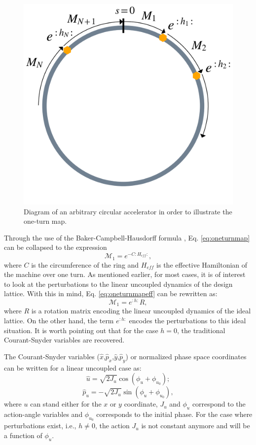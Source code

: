 \begin{figure}[H]
    \centering
    \includegraphics[width=0.7\columnwidth]{chapter2/oneturn.png}
    \caption{Diagram of an arbitrary circular accelerator in order to illustrate the one-turn map.}
    \label{fig:oneturn}
 \end{figure}

Through the use of the Baker-Campbell-Hausdorff formula \cite{bch}, Eq. \ref{eq:oneturnmap} can be collapsed to the expression 
\begin{equation}
    \label{eq:oneturnmapeff}
    \mathcal{M}_1=e^{-C :H_{eff}:},
\end{equation}
where $C$ is the circumference of the ring and $H_{eff}$ is the effective Hamiltonian of the machine over one turn. As mentioned earlier, for most cases, it is of interest to look at the perturbations to the linear uncoupled dynamics of the design lattice. With this in mind, Eq. \ref{eq:oneturnmapeff} can be rewritten as:
\begin{equation}
    \label{eq:oneturnmapeff1}
    \mathcal{M}_1=e^{:h:}R,
\end{equation}
where $R$ is a rotation matrix encoding the linear uncoupled dynamics of the ideal lattice. On the other hand, the term $e^{:h:}$ encodes the perturbations to this ideal situation. It is worth pointing out that for the case $h=0$, the traditional Courant-Snyder variables are recovered.   

The Courant-Snyder variables ($\hat{x}$,$\hat{p}_x$,$\hat{y}$,$\hat{p}_y$) or normalized phase space coordinates can be written for a linear uncoupled case as:
\begin{equation}
    \label{eq:norm1}
    \hat{u}=\sqrt{2J_u} \cos \left( \phi_u + \phi_{u_0}\right);
\end{equation}
\begin{equation}
    \label{eq:norm2}
    \hat{p}_u=-\sqrt{2J_u} \sin \left( \phi_u + \phi_{u_0}\right),
\end{equation}
where $u$ can stand either for the $x$ or $y$ coordinate, $J_u$ and $\phi_u$ correspond to the action-angle variables and $\phi_{u_0}$ corresponds to the initial phase. For the case where perturbations exist, i.e., $h \neq 0$, the action $J_u$ is not constant anymore and will be a function of $\phi_u$.  

